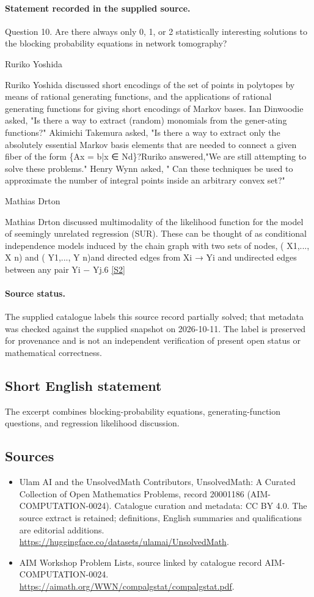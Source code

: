 \documentclass[11pt]{article}
\begin{document}
\paragraph{Statement recorded in the supplied source.}
Question 10. Are there always only 0, 1, or 2 statistically interesting solutions to the blocking probability equations in network tomography?

Ruriko Yoshida

Ruriko Yoshida discussed short encodings of the set of points in polytopes by means of rational generating functions, and the applications of rational generating functions for giving short encodings of Markov bases. Ian Dinwoodie asked, "Is there a way to extract (random) monomials from the gener-ating functions?" Akimichi Takemura asked, "Is there a way to extract only the absolutely essential Markov basis elements that are needed to connect a given fiber of the form \{Ax = b|x ∈ Nd\}?Ruriko answered,"We are still attempting to solve these problems." Henry Wynn asked, " Can these techniques be used to approximate the number of integral points inside an arbitrary convex set?"

Mathias Drton

Mathias Drton discussed multimodality of the likelihood function for the model of seemingly unrelated regression (SUR). These can be thought of as conditional independence models induced by the chain graph with two sets of nodes, ( X1,..., X n) and ( Y1,..., Y n)and directed edges from Xi → Yi and undirected edges between any pair Yi − Yj.6 \href{https://aimath.org/WWN/compalgstat/compalgstat.pdf}{[S2]}
\paragraph{Source status.}
The supplied catalogue labels this source record partially solved; that metadata was checked against the supplied snapshot on 2026-10-11. The label is preserved for provenance and is not an independent verification of present open status or mathematical correctness.
\subsection{Short English statement}
The excerpt combines blocking-probability equations, generating-function questions, and regression likelihood discussion.
\subsection{Sources}
\begin{itemize}
\item[S1] Ulam AI and the UnsolvedMath Contributors, UnsolvedMath: A Curated Collection of Open Mathematics Problems, record 20001186 (AIM-COMPUTATION-0024). Catalogue curation and metadata: CC BY 4.0. The source extract is retained; definitions, English summaries and qualifications are editorial additions.
\url{https://huggingface.co/datasets/ulamai/UnsolvedMath}.
\item[S2] AIM Workshop Problem Lists, source linked by catalogue record AIM-COMPUTATION-0024.
\url{https://aimath.org/WWN/compalgstat/compalgstat.pdf}.
\end{itemize}
\end{document}
